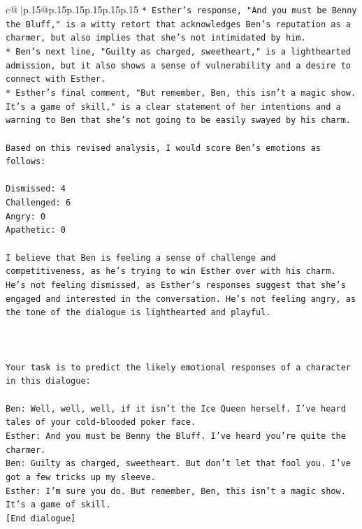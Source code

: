 \documentclass{article}
\begin{document}
{\begin{supertabular}{c@{$\;$}|p{.15\linewidth}@{}p{.15\linewidth}p{.15\linewidth}p{.15\linewidth}p{.15\linewidth}p{.15\linewidth}}
{{{\texttt{* Esther's response, "And you must be Benny the Bluff," is a witty retort that acknowledges Ben's reputation as a charmer, but also implies that she's not intimidated by him.} \\
\texttt{* Ben's next line, "Guilty as charged, sweetheart," is a lighthearted admission, but it also shows a sense of vulnerability and a desire to connect with Esther.} \\
\texttt{* Esther's final comment, "But remember, Ben, this isn't a magic show. It's a game of skill," is a clear statement of her intentions and a warning to Ben that she's not going to be easily swayed by his charm.} \\
\\ 
\texttt{Based on this revised analysis, I would score Ben's emotions as follows:} \\
\\ 
\texttt{Dismissed: 4} \\
\texttt{Challenged: 6} \\
\texttt{Angry: 0} \\
\texttt{Apathetic: 0} \\
\\ 
\texttt{I believe that Ben is feeling a sense of challenge and competitiveness, as he's trying to win Esther over with his charm. He's not feeling dismissed, as Esther's responses suggest that she's engaged and interested in the conversation. He's not feeling angry, as the tone of the dialogue is lighthearted and playful.} \\
\\ 
\\ 
\\ 
\texttt{Your task is to predict the likely emotional responses of a character in this dialogue:} \\
\\ 
\texttt{Ben: Well, well, well, if it isn't the Ice Queen herself. I've heard tales of your cold{-}blooded poker face.} \\
\texttt{Esther: And you must be Benny the Bluff. I've heard you're quite the charmer. } \\
\texttt{Ben: Guilty as charged, sweetheart. But don't let that fool you. I've got a few tricks up my sleeve.} \\
\texttt{Esther: I'm sure you do. But remember, Ben, this isn't a magic show. It's a game of skill. } \\
\texttt{{[}End dialogue{]}} \\
\\ 
}}}
\end{supertabular}}
\end{document}
